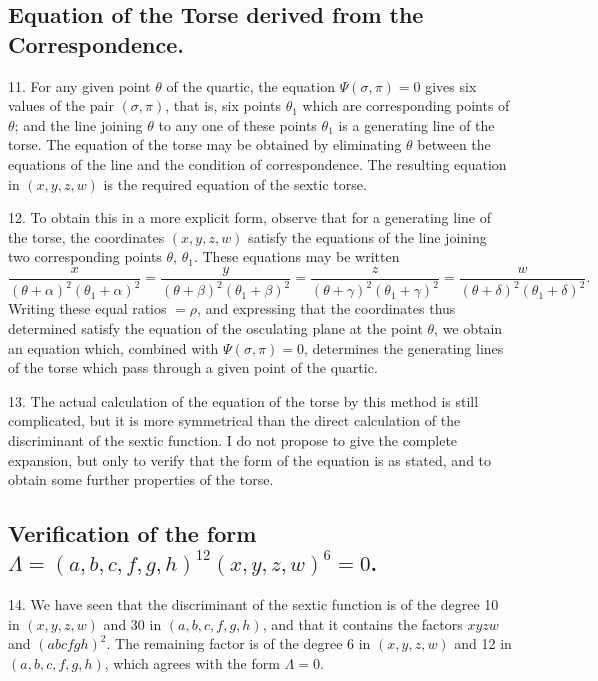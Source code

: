\documentclass[11pt,a4paper]{article}
\begin{document}
\subsection*{Equation of the Torse derived from the Correspondence.}

11. For any given point $\theta$ of the quartic, the equation $\Psi(\sigma, \pi) = 0$ gives six values of the pair $(\sigma, \pi)$, that is, six points $\theta_1$ which are corresponding points of $\theta$; and the line joining $\theta$ to any one of these points $\theta_1$ is a generating line of the torse. The equation of the torse may be obtained by eliminating $\theta$ between the equations of the line and the condition of correspondence. The resulting equation in $(x, y, z, w)$ is the required equation of the sextic torse.

12. To obtain this in a more explicit form, observe that for a generating line of the torse, the coordinates $(x, y, z, w)$ satisfy the equations of the line joining two corresponding points $\theta$, $\theta_1$. These equations may be written
\[
\frac{x}{(\theta + \alpha)^2(\theta_1 + \alpha)^2} =
\frac{y}{(\theta + \beta)^2(\theta_1 + \beta)^2} =
\frac{z}{(\theta + \gamma)^2(\theta_1 + \gamma)^2} =
\frac{w}{(\theta + \delta)^2(\theta_1 + \delta)^2}.
\]
Writing these equal ratios $= \rho$, and expressing that the coordinates thus determined satisfy the equation of the osculating plane at the point $\theta$, we obtain an equation which, combined with $\Psi(\sigma, \pi) = 0$, determines the generating lines of the torse which pass through a given point of the quartic.

13. The actual calculation of the equation of the torse by this method is still complicated, but it is more symmetrical than the direct calculation of the discriminant of the sextic function. I do not propose to give the complete expansion, but only to verify that the form of the equation is as stated, and to obtain some further properties of the torse.

\subsection*{Verification of the form $\Lambda = (a, b, c, f, g, h)^{12}(x, y, z, w)^6 = 0$.}

14. We have seen that the discriminant of the sextic function is of the degree 10 in $(x, y, z, w)$ and 30 in $(a, b, c, f, g, h)$, and that it contains the factors $xyzw$ and $(abcfgh)^2$. The remaining factor is of the degree 6 in $(x, y, z, w)$ and 12 in $(a, b, c, f, g, h)$, which agrees with the form $\Lambda = 0$.
\end{document}
